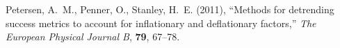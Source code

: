 \documentclass[11pt]{article}\usepackage[]{graphicx}\usepackage[]{color}
\begin{document}
\begin{FlushLeft}
\begin{thebibliography}{00}








Petersen, A.~M., Penner, O., Stanley, H.~E. (2011),
\newblock ``Methods for detrending success metrics to account
  for inflationary and deflationary factors,''
\newblock \emph{The European Physical Journal B}, \textbf{79}, 67--78.


\end{thebibliography}
\end{FlushLeft}
\end{document}
